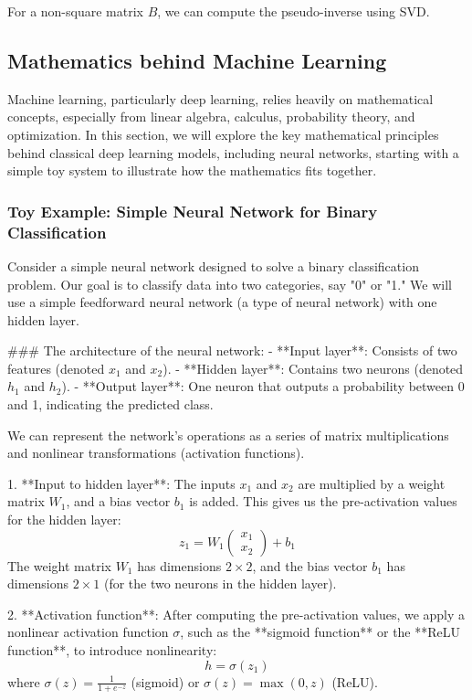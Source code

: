 \documentclass{article}
\begin{document}
For a non-square matrix \( B \), we can compute the pseudo-inverse using SVD.

\subsection{Mathematics behind Machine Learning}

Machine learning, particularly deep learning, relies heavily on mathematical concepts, especially from linear algebra, calculus, probability theory, and optimization. In this section, we will explore the key mathematical principles behind classical deep learning models, including neural networks, starting with a simple toy system to illustrate how the mathematics fits together.

\subsubsection*{Toy Example: Simple Neural Network for Binary Classification}

Consider a simple neural network designed to solve a binary classification problem. Our goal is to classify data into two categories, say "0" or "1." We will use a simple feedforward neural network (a type of neural network) with one hidden layer.

### The architecture of the neural network:
- **Input layer**: Consists of two features (denoted \( x_1 \) and \( x_2 \)).
- **Hidden layer**: Contains two neurons (denoted \( h_1 \) and \( h_2 \)).
- **Output layer**: One neuron that outputs a probability between 0 and 1, indicating the predicted class.

We can represent the network's operations as a series of matrix multiplications and nonlinear transformations (activation functions).

1. **Input to hidden layer**: The inputs \( x_1 \) and \( x_2 \) are multiplied by a weight matrix \( W_1 \), and a bias vector \( b_1 \) is added. This gives us the pre-activation values for the hidden layer:
   \[
   z_1 = W_1 \begin{pmatrix} x_1 \\ x_2 \end{pmatrix} + b_1
   \]
   The weight matrix \( W_1 \) has dimensions \( 2 \times 2 \), and the bias vector \( b_1 \) has dimensions \( 2 \times 1 \) (for the two neurons in the hidden layer).

2. **Activation function**: After computing the pre-activation values, we apply a nonlinear activation function \( \sigma \), such as the **sigmoid function** or the **ReLU function**, to introduce nonlinearity:
   \[
   h = \sigma(z_1)
   \]
   where \( \sigma(z) = \frac{1}{1 + e^{-z}} \) (sigmoid) or \( \sigma(z) = \max(0, z) \) (ReLU).
\end{document}
